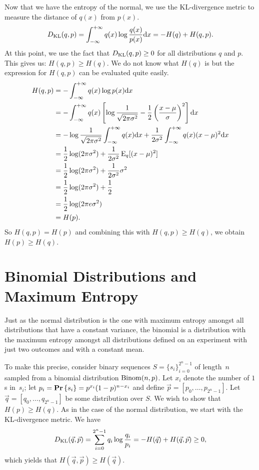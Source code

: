 Now that we have the entropy of the normal, we use the KL-divergence metric
to measure the distance of $q(x)$ from $p(x)$.
\begin{align*}
    D_{\text{KL}} (q, p) = \int_{- \infty}^{+ \infty} q(x) \log \frac{q(x)}{p(x)} \mathrm{d} x = - H(q) + H(q, p).
\end{align*}
At this point, we use the fact that $D_{\text{KL}} (q, p) \geq 0$ for all distributions $q$ and $p$.
This gives us: $H(q, p) \geq H(q)$. We do not know what $H(q)$ is but the expression
for $H(q, p)$ can be evaluated quite easily.
\begin{align*}
    H(q, p) & = - \int_{- \infty}^{+ \infty} q(x) \log p(x) \mathrm{d} x \\
            & =  - \int_{- \infty}^{+ \infty} q(x)
                \left [ \log \frac{1}{\sqrt{2 \pi \sigma^2}}
                - \frac{1}{2} \left ( \frac{x - \mu}{\sigma} \right )^2 \right ] \mathrm{d} x \\
            & = - \log \frac{1}{\sqrt{2 \pi \sigma^2}}  \int_{- \infty}^{+ \infty} q(x) \mathrm{d} x +
                \frac{1}{2 \sigma^2} \int_{- \infty}^{+ \infty} q(x) ( x - \mu )^2 \mathrm{d} x\\
            & = \frac{1}{2} \log (2 \pi \sigma^2) + \frac{1}{2 \sigma^2} \operatorname{E}_{q} [(x - \mu)^2] \\
            & = \frac{1}{2} \log (2 \pi \sigma^2) + \frac{1}{2 \sigma^2} \sigma^2 \\
            & = \frac{1}{2} \log (2 \pi \sigma^2) + \frac{1}{2} \\
            & = \frac{1}{2} \log (2 \pi e \sigma^2) \\
            & = H(p).
\end{align*}
So $H(q, p) = H(p)$ and combining this with $H(q, p) \geq H(q)$, we
obtain $H(p) \geq H(q)$.

\section{Binomial Distributions and Maximum Entropy}

Just as the normal distribution is the one with maximum entropy amongst all distributions that have
a constant variance, the binomial is a distribution with the maximum entropy amongst
all distributions defined on an experiment with just two outcomes and with a constant mean.

To make this precise, consider binary sequences $S = \{ s_i \}_{i = 0}^{2^n - 1}$
of length~$n$ sampled from a binomial distribution $\mathrm{Binom}(n, p)$. Let $x_i$ denote
the number of $1$s in~$s_i$; let $p_i = \mathbf{Pr} \left \{ s_i \right \} = p^{x_i} (1 - p)^{n - x_i}$ and define
$\vec{p} = [p_0, \ldots, p_{2^n - 1}]$. Let $\vec{q} = [q_0, \ldots, q_{2^n - 1}]$ be some
distribution over $S$. We wish to show that $H(p) \geq H(q)$. As in the case of the
normal distribution, we start with the KL-divergence metric. We have
\[
    D_{\text{KL}} (\vec{q}, \vec{p}) = \sum_{i = 0}^{2^n - 1} q_i \log \frac{q_i}{p_i}
        = - H(\vec{q}) + H(\vec{q}, \vec{p}) \geq 0,
\]
which yields that $H(\vec{q}, \vec{p}) \geq H(\vec{q})$.

